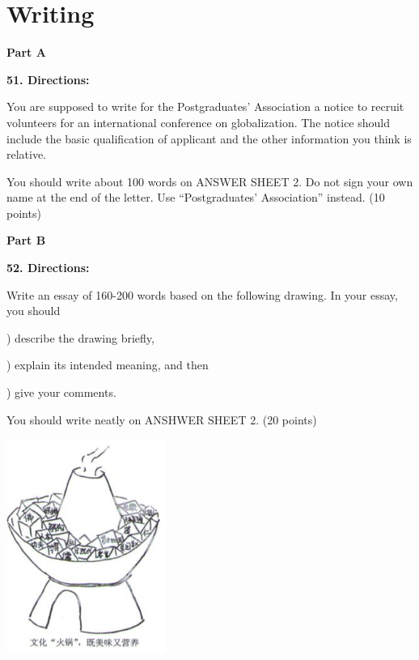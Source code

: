 
\section{Writing}
\textbf{Part A}

\textbf{51. Directions:}

\qquad You are supposed to write for the Postgraduates' Association a notice to recruit volunteers for an international conference on globalization. The notice should include the basic qualification of applicant and the other information you think is relative.

\qquad You should write about 100 words on ANSWER SHEET 2. Do not sign your own name at the end of the letter. Use ``Postgraduates' Association'' instead. (10 points)

\vspace{10pt}

\textbf{Part B}

\textbf{52. Directions:}

\qquad Write an essay of 160-200 words based on the following drawing. In your essay, you should

) describe the drawing briefly,

) explain its intended meaning, and then

) give your comments.

\qquad You should write neatly on ANSHWER SHEET 2. (20 points)

\begin{center}\includegraphics[height=7cm]{8.jpg}\end{center}